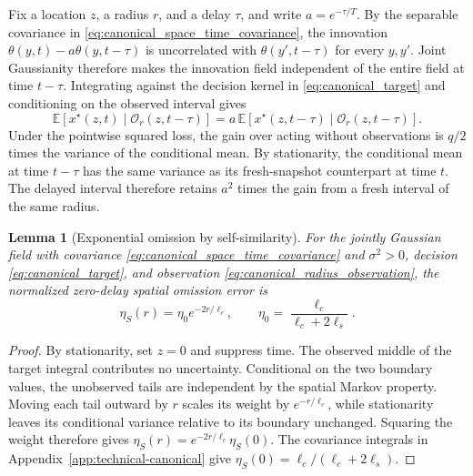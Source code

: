 \documentclass[11pt]{article}
\newtheorem{lemma}{Lemma}
\begin{document}
Fix a location $z$, a radius $r$, and a delay $\tau$, and write
$a=e^{-\tau/T}$. By the separable covariance in
\eqref{eq:canonical_space_time_covariance}, the innovation
$\theta(y,t)-a\theta(y,t-\tau)$ is uncorrelated with
$\theta(y',t-\tau)$ for every $y,y'$. Joint Gaussianity therefore makes
the innovation field independent of the entire field at time $t-\tau$.
Integrating against the decision kernel in \eqref{eq:canonical_target}
and conditioning on the observed interval gives
\[
\mathbb E[x^\star(z,t)\mid \mathcal O_r(z,t-\tau)]
= a\,\mathbb E[x^\star(z,t-\tau)\mid \mathcal O_r(z,t-\tau)].
\]
Under the pointwise squared loss, the gain over acting without observations
is $q/2$ times the variance of the conditional mean. By stationarity,
the conditional mean at time $t-\tau$ has the same variance as its
fresh-snapshot counterpart at time $t$. The delayed interval therefore
retains $a^2$ times the gain from a fresh interval of the same radius.

\begin{lemma}[Exponential omission by self-similarity]
\label{prop:canonical_eta_S}
For the jointly Gaussian field with covariance \eqref{eq:canonical_space_time_covariance}
and $\sigma^2>0$, decision
\eqref{eq:canonical_target}, and observation
\eqref{eq:canonical_radius_observation}, the normalized zero-delay spatial
omission error is
\begin{equation}
\eta_S(r)=\eta_0e^{-2r/\ell_c},\qquad
\eta_0=\frac{\ell_c}{\ell_c+2\ell_s}.
\label{eq:canonical_eta_S}
\end{equation}
\end{lemma}

\begin{proof}
By stationarity, set $z=0$ and suppress time. The observed middle of the
target integral contributes no uncertainty. Conditional on the two boundary
values, the unobserved tails are independent by the spatial Markov property.
Moving each tail outward by $r$ scales its weight by $e^{-r/\ell_c}$,
while stationarity leaves its conditional variance relative to its boundary
unchanged. Squaring the weight therefore gives
$\eta_S(r)=e^{-2r/\ell_c}\eta_S(0)$.
The covariance integrals in Appendix~\ref{app:technical-canonical} give
$\eta_S(0)=\ell_c/(\ell_c+2\ell_s)$.
\end{proof}
\end{document}
